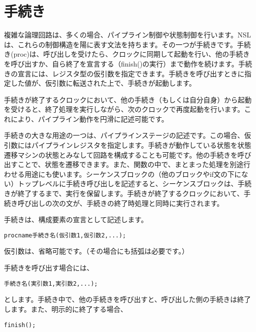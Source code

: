 \chapter{手続き}
\label{chap:procedure}

複雑な論理回路は、多くの場合、パイプライン制御や状態制御を行います。NSLは、これらの制御構造を陽に表す文法を持ちます。その一つが手続きです。手続き(proc)は、呼び出しを受けたら、クロックに同期して起動を行い、他の手続きを呼び出すか、自ら終了を宣言する（finish()の実行）まで動作を続けます。手続きの宣言には、レジスタ型の仮引数を指定できます。手続きを呼び出すときに指定した値が、仮引数に転送された上で、手続きが起動します。

手続きが終了するクロックにおいて、他の手続き（もしくは自分自身）から起動を受けると、終了処理を実行しながら、次のクロックで再度起動を行います。これにより、パイプライン動作を円滑に記述可能です。

手続きの大きな用途の一つは、パイプラインステージの記述です。この場合、仮引数にはパイプラインレジスタを指定します。手続きが動作している状態を状態遷移マシンの状態とみなして回路を構成することも可能です。他の手続きを呼び出すことで、状態を遷移できます。また、関数の中で、まとまった処理を別途行わせる用途にも使います。シーケンスブロックの（他のブロックやif文の下にない）トップレベルに手続き呼び出しを記述すると、シーケンスブロックは、手続きが終了するまで、実行を保留します。手続きが終了するクロックにおいて、手続き呼び出しの次の文が、手続きの終了時処理と同時に実行されます。

手続きは、構成要素の宣言として記述します。

\begin{reviewemlist}
\begin{alltt}
proc\textunderscore{}name  手続き名(仮引数1, 仮引数2, ...);
\end{alltt}
\end{reviewemlist}

仮引数は、省略可能です。（その場合にも括弧は必要です。）

手続きを呼び出す場合には、

\begin{reviewemlist}
\begin{alltt}
手続き名(実引数1, 実引数2, ...);
\end{alltt}
\end{reviewemlist}

とします。手続き中で、他の手続きを呼び出すと、呼び出した側の手続きは終了します。また、明示的に終了する場合、

\begin{reviewemlist}
\begin{alltt}
finish();
\end{alltt}
\end{reviewemlist}

